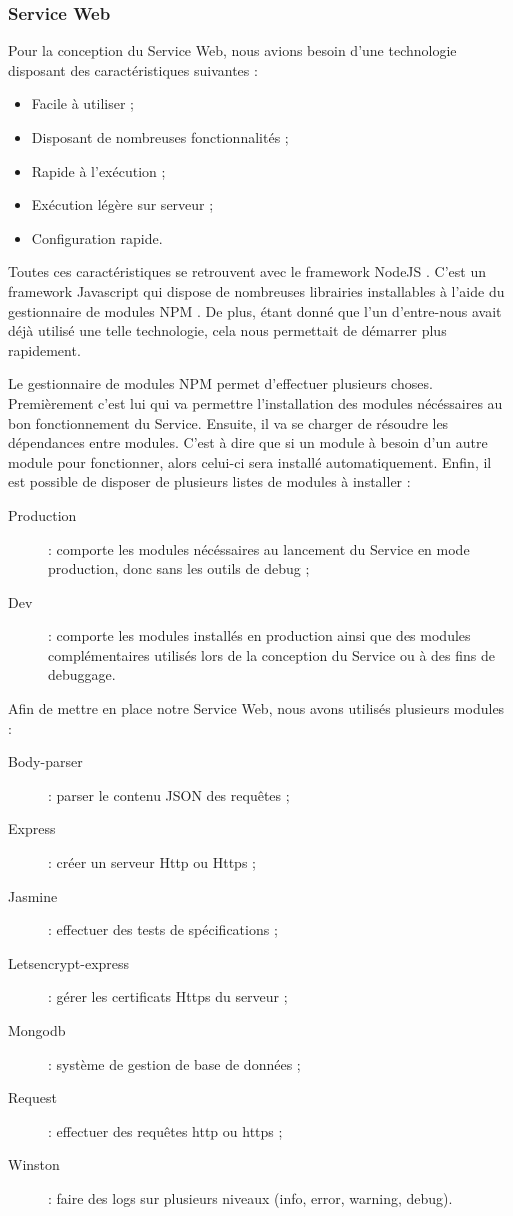 \subsubsection{Service Web}

Pour la conception du Service Web, nous avions besoin d'une technologie disposant des caractéristiques suivantes :
\begin{itemize}
    \item Facile à utiliser ;
    \item Disposant de nombreuses fonctionnalités ;
    \item Rapide à l'exécution ;
    \item Exécution légère sur serveur ;
    \item Configuration rapide.
\end{itemize}

Toutes ces caractéristiques se retrouvent avec le framework NodeJS \cite{nodejs}. C'est un framework Javascript qui dispose de nombreuses librairies installables à l'aide du gestionnaire de modules NPM \cite{npmjs}. De plus, étant donné que l'un d'entre-nous avait déjà utilisé une telle technologie, cela nous permettait de démarrer plus rapidement.

Le gestionnaire de modules NPM permet d'effectuer plusieurs choses.
Premièrement c'est lui qui va permettre l'installation des modules nécéssaires au bon fonctionnement du Service. Ensuite, il va se charger de résoudre les dépendances entre modules. C'est à dire que si un module à besoin d'un autre module pour fonctionner, alors celui-ci sera installé automatiquement.
Enfin, il est possible de disposer de plusieurs listes de modules à installer :
\begin{description}
    \item [Production] : comporte les modules nécéssaires au lancement du Service en mode production, donc sans les outils de debug ;
    \item [Dev] : comporte les modules installés en production ainsi que des modules complémentaires utilisés lors de la conception du Service ou à des fins de debuggage.
\end{description}

Afin de mettre en place notre Service Web, nous avons utilisés plusieurs modules :
\begin{description}
    \item [Body-parser] : parser le contenu JSON des requêtes ;
    \item [Express] : créer un serveur Http ou Https ;
    \item [Jasmine] : effectuer des tests de spécifications ;
    \item [Letsencrypt-express] : gérer les certificats Https du serveur ;
    \item [Mongodb] : système de gestion de base de données ;
    \item [Request] : effectuer des requêtes http ou https ;
    \item [Winston] : faire des logs sur plusieurs niveaux (info, error, warning, debug).
\end{description}